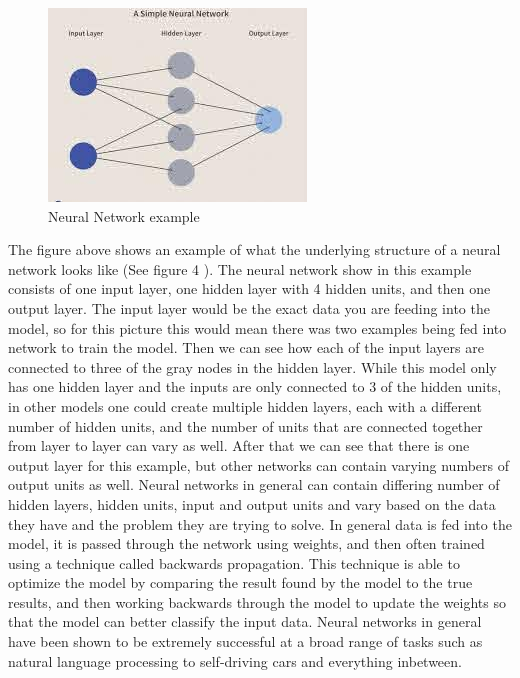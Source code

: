 \documentclass[12pt]{article}
\begin{document}
\begin{figure}

{\centering \includegraphics[width=0.75\linewidth,height=0.25\textheight]{images/neural_net} 

}

\caption{Neural Network example}\label{fig:sample-fig4}
\end{figure}

The figure above shows an example of what the underlying structure of a
neural network looks like (See figure 4 \citet{Investopedia}). The
neural network show in this example consists of one input layer, one
hidden layer with 4 hidden units, and then one output layer. The input
layer would be the exact data you are feeding into the model, so for
this picture this would mean there was two examples being fed into
network to train the model. Then we can see how each of the input layers
are connected to three of the gray nodes in the hidden layer. While this
model only has one hidden layer and the inputs are only connected to 3
of the hidden units, in other models one could create multiple hidden
layers, each with a different number of hidden units, and the number of
units that are connected together from layer to layer can vary as well.
After that we can see that there is one output layer for this example,
but other networks can contain varying numbers of output units as well.
Neural networks in general can contain differing number of hidden
layers, hidden units, input and output units and vary based on the data
they have and the problem they are trying to solve. In general data is
fed into the model, it is passed through the network using weights, and
then often trained using a technique called backwards propagation. This
technique is able to optimize the model by comparing the result found by
the model to the true results, and then working backwards through the
model to update the weights so that the model can better classify the
input data. Neural networks in general have been shown to be extremely
successful at a broad range of tasks such as natural language processing
to self-driving cars and everything inbetween.
\end{document}
